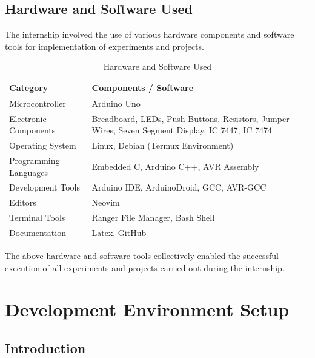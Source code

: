 \documentclass[12pt,a4paper]{report}
\begin{document}

\section{Hardware and Software Used}

The internship involved the use of various hardware components and software tools for implementation of experiments and projects.

\begin{table}[H]
\centering
\caption{Hardware and Software Used}
\begin{tabular}{|p{6cm}|p{7cm}|}
\hline
\textbf{Category} & \textbf{Components / Software} \\
\hline
Microcontroller & Arduino Uno \\
\hline
Electronic Components & Breadboard, LEDs, Push Buttons, Resistors, Jumper Wires, Seven Segment Display, IC 7447, IC 7474 \\
\hline
Operating System & Linux, Debian (Termux Environment) \\
\hline
Programming Languages & Embedded C, Arduino C++, AVR Assembly \\
\hline
Development Tools & Arduino IDE, ArduinoDroid, GCC, AVR-GCC \\
\hline
Editors & Neovim \\
\hline
Terminal Tools & Ranger File Manager, Bash Shell \\
\hline
Documentation & Latex, GitHub \\
\hline
\end{tabular}
\end{table}

\vspace{0.8cm}

The above hardware and software tools collectively enabled the successful execution of all experiments and projects carried out during the internship.

\chapter{Development Environment Setup}

\section{Introduction}
\end{document}
